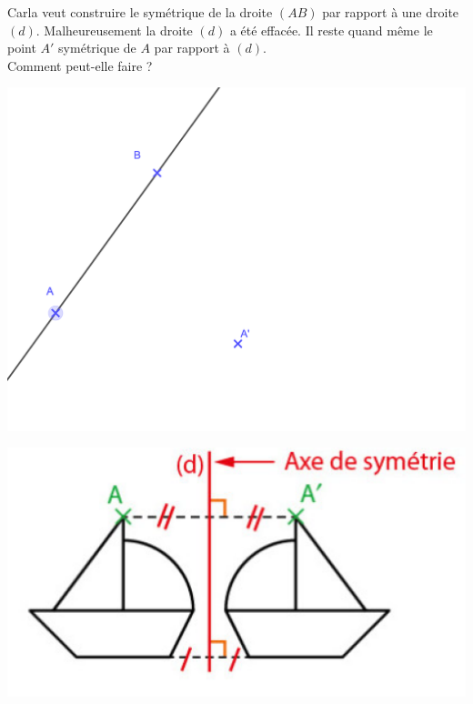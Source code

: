 \documentclass[12pt,a4paper]{article}
\date{}
\title{}
\begin{document}





\begin{myact}
	\noindent Carla veut construire le symétrique de la droite $(AB)$ par rapport à une droite $(d)$. 
	Malheureusement la droite $(d)$ a été effacée. Il reste quand même le point $A'$ symétrique de $A$ par rapport à $(d)$.\\
	
	\noindent Comment peut-elle faire ?
	
	\begin{center}
		\includegraphics[scale=0.22]{act1}
	\end{center}
\end{myact}


\begin{center}
	\includegraphics[scale=.8]{fig1}
\end{center}
\end{document}
